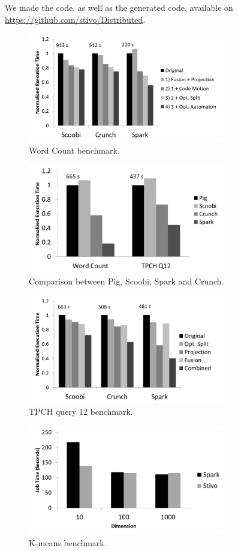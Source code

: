 We made the \tool code, as well as the generated code, available on \url{https://github.com/stivo/Distributed}.

\begin{figure}[t]
    \includegraphics[width=8.6cm]{figures/word-count}
   \caption{Word Count benchmark.}
   \label{fig:word-count}%
\end{figure}

\begin{figure}[t]
    \includegraphics[width=8.6cm]{figures/pig}
   \caption{Comparison between Pig, Scoobi, Spark and Crunch.}
   \label{fig:pig}%
\end{figure}

\begin{figure}[t]
    \includegraphics[width=8.6cm]{figures/tpch}

   \caption{TPCH query 12 benchmark.}
  \label{fig:tpch}%
\end{figure}
\begin{figure}[t]
    \includegraphics[width=8.6cm]{figures/k-means}
   \caption{K-means benchmark.}
   \label{fig:k-means}%
\end{figure}

